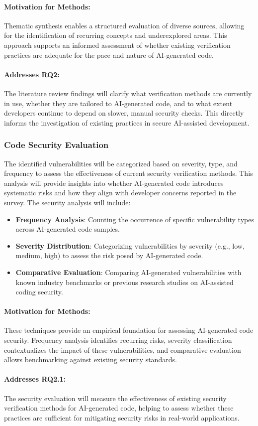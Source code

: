 \paragraph{Motivation for Methods:} Thematic synthesis enables a structured evaluation of diverse sources, allowing for the identification of recurring concepts and underexplored areas. This approach supports an informed assessment of whether existing verification practices are adequate for the pace and nature of AI-generated code.
\paragraph{Addresses RQ2:} The literature review findings will clarify what verification methods are currently in use, whether they are tailored to AI-generated code, and to what extent developers continue to depend on slower, manual security checks. This directly informs the investigation of existing practices in secure AI-assisted development.

\subsubsection{Code Security Evaluation}
The identified vulnerabilities will be categorized based on severity, type, and frequency to assess the effectiveness of current security verification methods. This analysis will provide insights into whether AI-generated code introduces systematic risks and how they align with developer concerns reported in the survey.
The security analysis will include:

\begin{itemize}
    \item \textbf{Frequency Analysis}: Counting the occurrence of specific vulnerability types across AI-generated code samples.
    \item \textbf{Severity Distribution}: Categorizing vulnerabilities by severity (e.g., low, medium, high) to assess the risk posed by AI-generated code.
    \item \textbf{Comparative Evaluation}: Comparing AI-generated vulnerabilities with known industry benchmarks or previous research studies on AI-assisted coding security.
\end{itemize}

\paragraph{Motivation for Methods:} These techniques provide an empirical foundation for assessing AI-generated code security. Frequency analysis identifies recurring risks, severity classification contextualizes the impact of these vulnerabilities, and comparative evaluation allows benchmarking against existing security standards.

\paragraph{Addresses RQ2.1:} The security evaluation will measure the effectiveness of existing security verification methods for AI-generated code, helping to assess whether these practices are sufficient for mitigating security risks in real-world applications.

